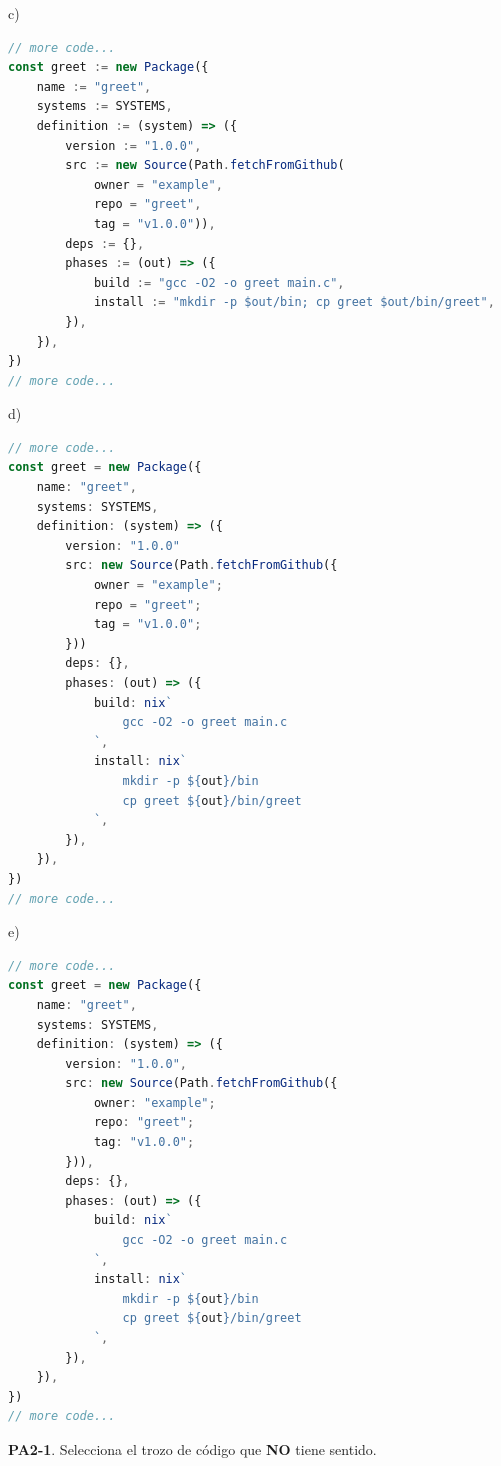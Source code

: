 \begin{opcion}{c)}
\begin{lstlisting}[language=TypeScript]
// more code...
const greet := new Package({
    name := "greet",
    systems := SYSTEMS,
    definition := (system) => ({
        version := "1.0.0",
        src := new Source(Path.fetchFromGithub(
            owner = "example",
            repo = "greet",
            tag = "v1.0.0")),
        deps := {},
        phases := (out) => ({
            build := "gcc -O2 -o greet main.c",
            install := "mkdir -p $out/bin; cp greet $out/bin/greet",
        }),
    }),
})
// more code...
\end{lstlisting}
\end{opcion}

\begin{opcion}{d)}
\begin{lstlisting}[language=TypeScript]
// more code...
const greet = new Package({
    name: "greet",
    systems: SYSTEMS,
    definition: (system) => ({
        version: "1.0.0"
        src: new Source(Path.fetchFromGithub({
            owner = "example";
            repo = "greet";
            tag = "v1.0.0";
        }))
        deps: {},
        phases: (out) => ({
            build: nix`
                gcc -O2 -o greet main.c
            `,
            install: nix`
                mkdir -p ${out}/bin
                cp greet ${out}/bin/greet
            `,
        }),
    }),
})
// more code...
\end{lstlisting}
\end{opcion}

\begin{opcion}{e)}
\begin{lstlisting}[language=TypeScript]
// more code...
const greet = new Package({
    name: "greet",
    systems: SYSTEMS,
    definition: (system) => ({
        version: "1.0.0",
        src: new Source(Path.fetchFromGithub({
            owner: "example";
            repo: "greet";
            tag: "v1.0.0";
        })),
        deps: {},
        phases: (out) => ({
            build: nix`
                gcc -O2 -o greet main.c
            `,
            install: nix`
                mkdir -p ${out}/bin
                cp greet ${out}/bin/greet
            `,
        }),
    }),
})
// more code...
\end{lstlisting}
\end{opcion}

\textbf{PA2-1}. Selecciona el trozo de código que \textbf{NO} tiene sentido.

